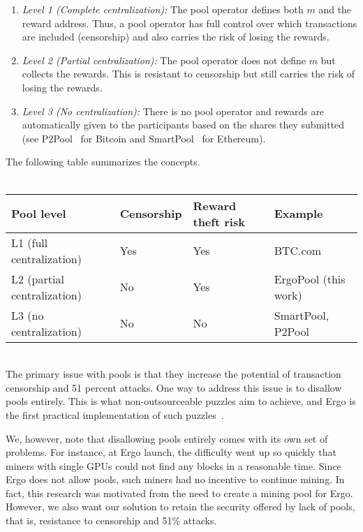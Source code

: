 \documentclass[runningheads]{llncs}
\begin{document}
\begin{enumerate}
	\item {\em Level 1 (Complete centralization):} The pool operator defines both $m$ and the reward address. Thus, a pool operator has full control over which transactions are included (censorship) and also carries the risk of losing the rewards.
	\item {\em Level 2 (Partial centralization):} The pool operator does not define $m$ but collects the rewards. This is resistant to censorship but still carries the risk of losing the rewards. %
	\item {\em Level 3 (No centralization):} There is no pool operator and rewards are automatically given to the participants based on the shares they submitted (see P2Pool~\cite{chesterman2018p2pool} for Bitcoin and SmartPool~\cite{luu2017smartpool} for Ethereum).
\end{enumerate}

The following table summarizes the concepts.\\~\\
	\begin{tabular}{|l|l|l|l|}\hline
	Pool level	& Censorship & Reward theft risk &Example\\\hline
	L1 (full centralization)	&Yes & Yes  & BTC.com\\
	L2 (partial centralization)	& No & Yes &ErgoPool (this work)\\
	L3 (no centralization)	& No & No &SmartPool\cite{luu2017smartpool}, P2Pool~\cite{chesterman2018p2pool}\\\hline
	\end{tabular}

~\\

The primary issue with pools is that they increase the potential of transaction censorship and 51 percent attacks. One way to address this issue is to disallow pools entirely. This is what non-outsourceable puzzles aim to achieve, and Ergo is the first practical implementation of such puzzles~\cite{ergo}. 

We, however, note that disallowing pools entirely comes with its own set of problems. For instance, at Ergo launch, the difficulty went up so quickly that miners with single GPUs could not find any blocks in a reasonable time. Since Ergo does not allow pools, such miners had no incentive to continue mining. In fact, this research was motivated from the need to create a mining pool for Ergo. However, we also want our solution to retain the security offered by lack of pools, that is, resistance to censorship and 51\% attacks. 
\end{document}
